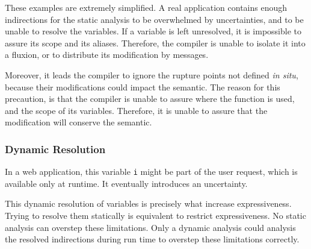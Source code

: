 These examples are extremely simplified.
A real application contains enough indirections for the static analysis to be overwhelmed by uncertainties, and to be unable to resolve the variables.
If a variable is left unresolved, it is impossible to assure its scope and its aliases.
Therefore, the compiler is unable to isolate it into a fluxion, or to distribute its modification by messages.

Moreover, it leads the compiler to ignore the rupture points not defined \textit{in situ}, because their modifications could impact the semantic.
The reason for this precaution, is that the compiler is unable to assure where the function is used, and the scope of its variables.
Therefore, it is unable to assure that the modification will conserve the semantic.

\subsubsection{Dynamic Resolution}

In a web application, this variable \texttt{i} might be part of the user request, which is available only at runtime.
It eventually introduces an uncertainty.

This dynamic resolution of variables is precisely what increase expressiveness.
Trying to resolve them statically is equivalent to restrict expressiveness.
No static analysis can overstep these limitations.
Only a dynamic analysis could analysis the resolved indirections during run time to overstep these limitations correctly.


